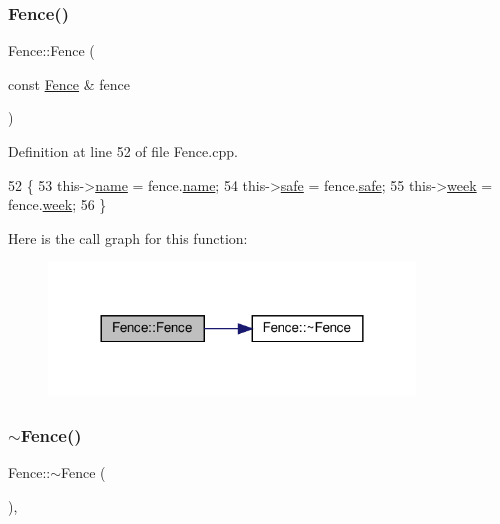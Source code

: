 \subsubsection{\texorpdfstring{Fence()}{Fence()}\hspace{0.1cm}{\footnotesize\ttfamily [3/3]}}
{\footnotesize\ttfamily Fence\+::\+Fence (\begin{DoxyParamCaption}\item[{const \hyperlink{class_fence}{Fence} \&}]{fence }\end{DoxyParamCaption})}



Definition at line 52 of file Fence.\+cpp.


\begin{DoxyCode}
52                                \{
53     this->\hyperlink{class_fence_aa405676733f25812b38ea0dd9ccd1863}{name} = fence.\hyperlink{class_fence_aa405676733f25812b38ea0dd9ccd1863}{name};
54     this->\hyperlink{class_fence_ad570430040eee657c625a67d5589c4b5}{safe} = fence.\hyperlink{class_fence_ad570430040eee657c625a67d5589c4b5}{safe};
55     this->\hyperlink{class_fence_ae589e973fa03316847aeceedd72e2b64}{week} = fence.\hyperlink{class_fence_ae589e973fa03316847aeceedd72e2b64}{week};
56 \}
\end{DoxyCode}
Here is the call graph for this function\+:\nopagebreak
\begin{figure}[H]
\begin{center}
\leavevmode
\includegraphics[width=276pt]{d0/db8/class_fence_a3fdfc7240f1e938dab4c9534c63aa427_cgraph}
\end{center}
\end{figure}
\mbox{\label{class_fence_a6c5e019535f94462bfab1ad19b865c55}} 
\subsubsection{\texorpdfstring{$\sim$\+Fence()}{~Fence()}}
{\footnotesize\ttfamily Fence\+::$\sim$\+Fence (\begin{DoxyParamCaption}{ }\end{DoxyParamCaption})\hspace{0.3cm}{\ttfamily [pure virtual]}, {\ttfamily [default]}}

